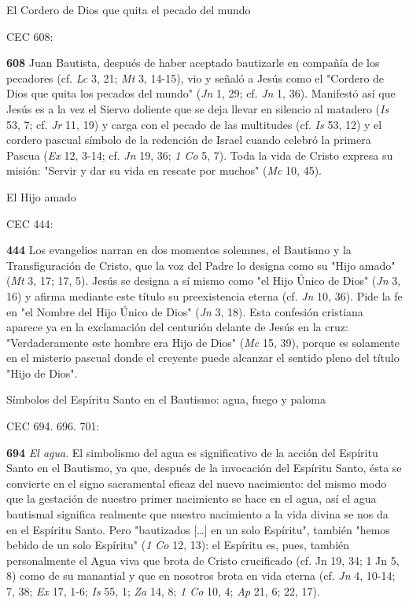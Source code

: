 \documentclass[]{article}
\begin{document}
El Cordero de Dios que quita el pecado del mundo

CEC 608:

\textbf{608} Juan Bautista, después de haber aceptado bautizarle en
compañía de los pecadores (cf. \emph{Lc} 3, 21; \emph{Mt} 3, 14-15), vio
y señaló a Jesús como el "Cordero de Dios que quita los pecados del
mundo" (\emph{Jn} 1, 29; cf. \emph{Jn} 1, 36). Manifestó así que Jesús
es a la vez el Siervo doliente que se deja llevar en silencio al
matadero (\emph{Is} 53, 7; cf. \emph{Jr} 11, 19) y carga con el pecado
de las multitudes (cf. \emph{Is} 53, 12) y el cordero pascual símbolo de
la redención de Israel cuando celebró la primera Pascua (\emph{Ex} 12,
3-14; cf. \emph{Jn} 19, 36; \emph{1 Co} 5, 7). Toda la vida de Cristo
expresa su misión: "Servir y dar su vida en rescate por muchos"
(\emph{Mc} 10, 45).

El Hijo amado

CEC 444:

\textbf{444} Los evangelios narran en dos momentos solemnes, el Bautismo
y la Transfiguración de Cristo, que la voz del Padre lo designa como su
"Hijo amado" (\emph{Mt} 3, 17; 17, 5). Jesús se designa a sí mismo como
"el Hijo Único de Dios" (\emph{Jn} 3, 16) y afirma mediante este título
su preexistencia eterna (cf. \emph{Jn} 10, 36). Pide la fe en "el Nombre
del Hijo Único de Dios" (\emph{Jn} 3, 18). Esta confesión cristiana
aparece ya en la exclamación del centurión delante de Jesús en la cruz:
"Verdaderamente este hombre era Hijo de Dios" (\emph{Mc} 15, 39), porque
es solamente en el misterio pascual donde el creyente puede alcanzar el
sentido pleno del título "Hijo de Dios".

Símbolos del Espíritu Santo en el Bautismo: agua, fuego y paloma

CEC 694. 696. 701:

\textbf{694} \emph{El agua}. El simbolismo del agua es significativo de
la acción del Espíritu Santo en el Bautismo, ya que, después de la
invocación del Espíritu Santo, ésta se convierte en el signo sacramental
eficaz del nuevo nacimiento: del mismo modo que la gestación de nuestro
primer nacimiento se hace en el agua, así el agua bautismal significa
realmente que nuestro nacimiento a la vida divina se nos da en el
Espíritu Santo. Pero "bautizados [\ldots{}] en un solo Espíritu", también
"hemos bebido de un solo Espíritu" (\emph{1 Co} 12, 13): el Espíritu es,
pues, también personalmente el Agua viva que brota de Cristo crucificado
(cf. Jn 19, 34; 1 Jn 5, 8) como de su manantial y que en nosotros brota
en vida eterna (cf. \emph{Jn} 4, 10-14; 7, 38; \emph{Ex} 17, 1-6;
\emph{Is} 55, 1; \emph{Za} 14, 8; \emph{1 Co} 10, 4; \emph{Ap} 21, 6;
22, 17).
\end{document}
